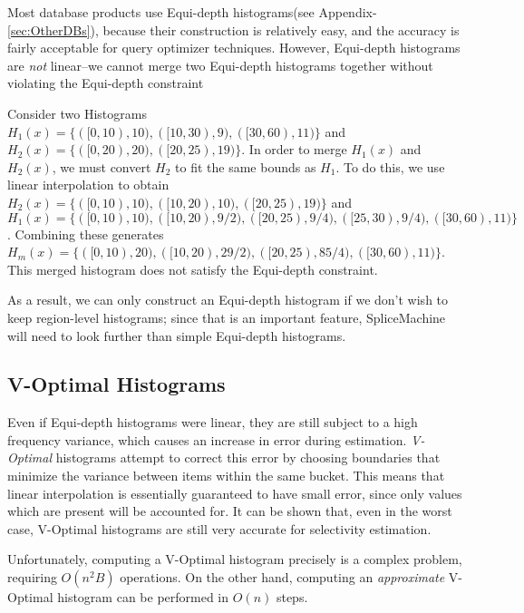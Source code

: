 Most database products use Equi-depth histograms(see Appendix-\ref{sec:OtherDBs}), because their construction is relatively easy, and the accuracy is fairly acceptable for query optimizer techniques. However, Equi-depth histograms are \emph{not} linear--we cannot merge two Equi-depth histograms together without violating the Equi-depth constraint

\begin{exmp}
				Consider two Histograms $H_1(x) = \lbrace ([0,10),10),([10,30),9),([30,60),11) \rbrace$ and $H_2(x) = \lbrace ([0,20),20),([20,25),19) \rbrace$. In order to merge $H_1(x)$ and $H_2(x)$, we must convert $H_2$ to fit the same bounds as $H_1$. To do this, we use linear interpolation to obtain $H_2(x) = \lbrace ([0,10),10),([10,20),10),([20,25),19) \rbrace$ and $H_1(x) = \lbrace ([0,10),10),([10,20),9/2),([20,25),9/4),([25,30),9/4),([30,60),11) \rbrace$. Combining these generates $H_m(x) = \lbrace ([0,10),20),([10,20),29/2),([20,25),85/4),([30,60),11) \rbrace$. This merged histogram does not satisfy the Equi-depth constraint.
\end{exmp}

As a result, we can only construct an Equi-depth histogram if we don't wish to keep region-level histograms; since that is an important feature, SpliceMachine will need to look further than simple Equi-depth histograms.

\subsection{V-Optimal Histograms}
\label{sec:VOptimal}
Even if Equi-depth histograms were linear, they are still subject to a high frequency variance, which causes an increase in error during estimation. \emph{V-Optimal} histograms attempt to correct this error by choosing boundaries that minimize the variance between items within the same bucket. This means that linear interpolation is essentially guaranteed to have small error, since only values which are present will be accounted for. It can be shown that, even in the worst case, V-Optimal histograms are still very accurate for selectivity estimation\cite{JagadishOptimalHistograms}.

Unfortunately, computing a V-Optimal histogram precisely is a complex problem, requiring $O(n^2B)$ operations\cite{JagadishOptimalHistograms}. On the other hand, computing an \emph{approximate} V-Optimal histogram can be performed in $O(n)$ steps\cite{GuhaApproximation,GuhaREHIST}. 

